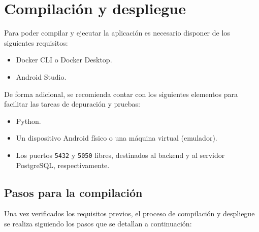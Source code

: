 \section{Compilación y despliegue}
\label{sec:compilacion}
Para poder compilar y ejecutar la aplicación es necesario disponer de los siguientes requisitos:

\begin{itemize}
    \item Docker CLI o Docker Desktop.
    \item Android Studio.
\end{itemize}

De forma adicional, se recomienda contar con los siguientes elementos para facilitar las tareas de depuración y pruebas:

\begin{itemize}
    \item Python.
    \item Un dispositivo Android físico o una máquina virtual (emulador).
    \item Los puertos \texttt{5432} y \texttt{5050} libres, destinados al backend y al servidor PostgreSQL, respectivamente.
\end{itemize}

\subsection{Pasos para la compilación}

Una vez verificados los requisitos previos, el proceso de compilación y despliegue se realiza siguiendo los pasos que se detallan a continuación:

